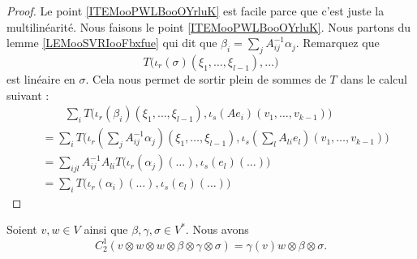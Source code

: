 \begin{proof}
	Le point \ref{ITEMooPWLBooOYrluK} est facile parce que c'est juste la multilinéarité. Nous faisons le point \ref{ITEMooPWLBooOYrluK}.
	Nous partons du lemme \ref{LEMooSVRIooFbxfue} qui dit que \( \beta_i=\sum_jA^{-1}_{ij}\alpha_j\). Remarquez que
	\begin{equation}
		T\big( \iota_r(\sigma)(\xi_1,\ldots,\xi_{l-1}), \ldots \big)
	\end{equation}
	est linéaire en \( \sigma\). Cela nous permet de sortir plein de sommes de \( T\) dans le calcul suivant :
	\begin{subequations}
		\begin{align}
			 & \qquad\sum_iT\Big(  \iota_r(\beta_i)(\xi_1,\ldots,\xi_{l-1}),\iota_s(Ae_i)(v_1,\ldots,v_{k-1})  \Big)                       \\
			 & =\sum_iT\Big( \iota_r(\sum_jA^{-1}_{ij}\alpha_j)(\xi_1,\ldots,\xi_{l-1}),\iota_s(\sum_lA_{li}e_l)(v_1,\ldots,v_{k-1}) \Big) \\
			 & =\sum_{ijl}A^{-1}_{ij}A_{li}T\big( \iota_r(\alpha_j)(\ldots), \iota_s(e_l)(\ldots) \big)                                    \\
			 & =\sum_{i}T\big( \iota_r(\alpha_i)(\ldots), \iota_s(e_l)(\ldots) \big)
		\end{align}
	\end{subequations}
\end{proof}

\begin{proposition}
	Soient \( v,w\in V\) ainsi que \( \beta,\gamma,\sigma\in V^*\). Nous avons
	\begin{equation}
		C_2^1(v\otimes w\otimes w\otimes \beta\otimes \gamma\otimes \sigma)=\gamma(v)w\otimes\beta\otimes\sigma.
	\end{equation}
\end{proposition}

